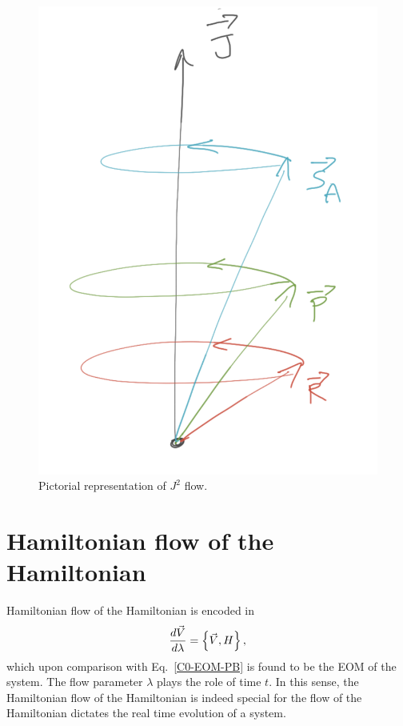 \begin{figure}
  \centering
  \includegraphics[width=0.4\linewidth]{Jsq_flow}
  \caption{Pictorial representation of $J^2$ flow.
    \vspace{-1.em}
  }
  \label{Jsq_flow}
\end{figure}




\section{Hamiltonian flow of the Hamiltonian}


Hamiltonian flow of the Hamiltonian is encoded in 
\begin{align}
\frac{d \vec{V}}{d \lambda}  =   \left\lbrace \vec{V}, H \right\rbrace,
\end{align}
which upon comparison with Eq.~\eqref{C0-EOM-PB} is found to
be the EOM of the system. The flow parameter $\lambda$ plays the role of
time $t$. In this sense, the Hamiltonian flow of the 
Hamiltonian is indeed special for the flow of the Hamiltonian
dictates the real time evolution of a system.
























